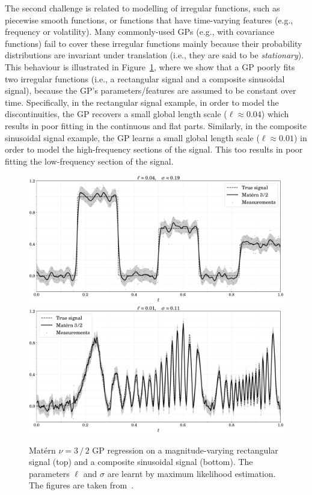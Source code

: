 The second challenge is related to modelling of irregular functions, such as piecewise smooth functions, or functions that have time-varying features (e.g., frequency or volatility). Many commonly-used GPs (e.g., with \matern covariance functions) fail to cover these irregular functions mainly because their probability distributions are invariant under translation (i.e., they are said to be \textit{stationary}). This behaviour is illustrated in Figure~\ref{fig:gp-fail}, where we show that a \matern GP poorly fits two irregular functions (i.e., a rectangular signal and a composite sinusoidal signal), because the GP's parameters/features are assumed to be constant over time. Specifically, in the rectangular signal example, in order to model the discontinuities, the \matern GP recovers a small global length scale ($\ell \approx 0.04$) which results in poor fitting in the continuous and flat parts. Similarly, in the composite sinusoidal signal example, the GP learns a small global length scale ($\ell \approx 0.01$) in order to model the high-frequency sections of the signal. This too results in poor fitting the low-frequency section of the signal.

\begin{figure}[t!]
	\centering
	\includegraphics[width=.95\linewidth]{figs/gp-fail-example-m32}\\
	\includegraphics[width=.95\linewidth]{figs/gp-fail-example-sinu-m32}
	\caption{Mat\'{e}rn $\nu=3\,/\,2$ GP regression on a magnitude-varying rectangular signal (top) and a composite sinusoidal signal (bottom). The parameters $\ell$ and $\sigma$ are learnt by maximum likelihood estimation. The figures are taken from~\citet{Zhao2020SSDGP}.}
	\label{fig:gp-fail}
\end{figure}

